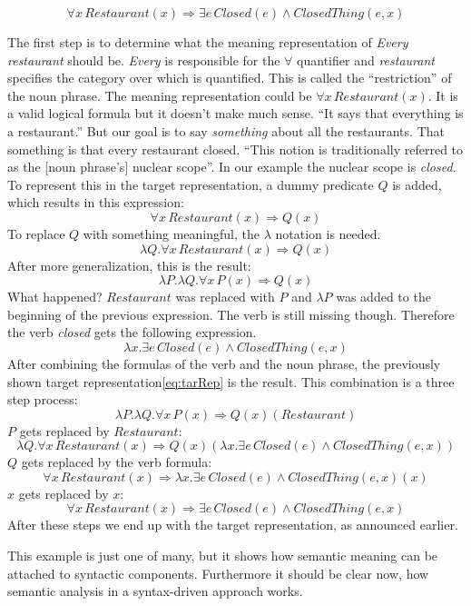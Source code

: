 \documentclass[12pt,twoside]{scrartcl}
\theoremstyle{plain}
\theoremstyle{definition}
\theoremstyle{remark}
\begin{document}
		\begin{equation}
		\label{eq:tarRep}
			\forall x \,Restaurant(x) \Rightarrow \exists e \,Closed(e) \wedge ClosedThing(e,x)
		\end{equation}
		
		The first step is to determine what the meaning representation of \textit{Every restaurant} should be. \textit{Every} is responsible for the $\forall$ quantifier and \textit{restaurant} specifies the category over which is quantified. This is called the ``restriction''\cite[p.~622]{Jurafsky2009} of the noun phrase. The meaning representation could be $\forall x\,Restaurant(x)$. It is a valid logical formula but it doesn't make much sense. ``It says that everything is a restaurant.''\cite[p.~622]{Jurafsky2009} But our goal is to say \textit{something} about all the restaurants. That something is that every restaurant closed. ``This notion is traditionally referred to as the [noun phrase's] nuclear scope''\cite[p.~622]{Jurafsky2009}. In our example the nuclear scope is \textit{closed}. To represent this in the target representation, a dummy predicate $Q$ is added, which results in this expression:
		\[
			\forall x\,Restaurant(x) \Rightarrow Q(x)
		\]
		To replace $Q$ with something meaningful, the $\lambda$ notation is needed.
		\[
			\lambda Q.\forall x\,Restaurant(x) \Rightarrow Q(x)
		\] 
		After more generalization, this is the result:
		\[
			\lambda P.\lambda Q.\forall x\,P(x) \Rightarrow Q(x)
		\]
		What happened? $Restaurant$ was replaced with $P$ and $\lambda P$ was added to the beginning of the previous expression. The verb is still missing though. Therefore the verb \textit{closed} gets the following expression.
		\[
			\lambda x.\exists e\,Closed(e) \wedge ClosedThing(e,x)
		\]
		After combining the formulas of the verb and the noun phrase, the previously shown target representation\eqref{eq:tarRep} is the result. This combination is a three step process:
		\[
			\lambda P.\lambda Q.\forall x\,P(x) \Rightarrow Q(x)(Restaurant)
		\]
		$P$ gets replaced by $Restaurant$:
		\[
			\lambda Q.\forall x\,Restaurant(x) \Rightarrow Q(x)(\lambda x.\exists e\,Closed(e) \wedge ClosedThing(e,x))
		\]
		$Q$ gets replaced by the verb formula:
		\[
			\forall x\,Restaurant(x) \Rightarrow \lambda x.\exists e\,Closed(e) \wedge ClosedThing(e,x)(x)
		\]
		$x$ gets replaced by $x$:
		\[
			\forall x\,Restaurant(x) \Rightarrow \exists e\,Closed(e) \wedge ClosedThing(e,x)
		\]
		After these steps we end up with the target representation, as announced earlier.
		
		This example is just one of many, but it shows how semantic meaning can be attached to syntactic components. Furthermore it should be clear now, how semantic analysis in a syntax-driven approach works.
\end{document}
